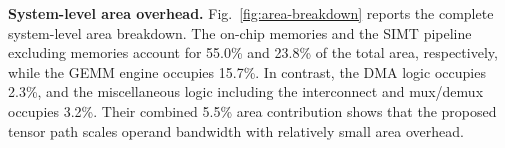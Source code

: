 \documentclass[sigconf,anonymous,nonacm]{acmart}
\newcommand{\ours}{\textsc{FINISH}}
\begin{document}
\textbf{System-level area overhead.}
Fig.~\ref{fig:area-breakdown} reports the complete system-level area breakdown.
The on-chip memories and the SIMT pipeline excluding memories account for 55.0\% and 23.8\% of the total area, respectively, while the GEMM engine occupies 15.7\%. In contrast, the DMA logic occupies 2.3\%, and the miscellaneous logic including the interconnect and mux/demux occupies 3.2\%. Their combined 5.5\% area contribution shows that the proposed tensor path scales operand bandwidth with relatively small area overhead.

\end{document}
